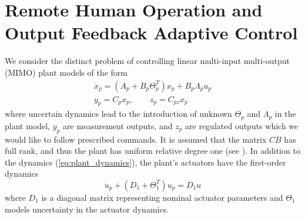 
\section{Remote Human Operation and Output Feedback Adaptive Control}  \label{sec:mimo_problem}
We consider the distinct problem of controlling linear multi-input multi-output (MIMO) plant models of the form
\begin{equation}
\begin{gathered}
\dot x_p = (A_p + B_p \Theta_p^T) x_p + B_p \Lambda_p u_p \\
y_p = C_p x_p, \qquad z_p = C_{pz} x_p \label{eq:plant_dynamics}
\end{gathered}
\end{equation}
where uncertain dynamics lead to the introduction of unknown $\Theta_p$ and $\Lambda_p$ in the plant model, $y_p$ are measurement outputs, and $z_p$ are regulated outputs which we would like to follow prescribed commands. It is assumed that the matrix $CB$ has full rank, and thus the plant has uniform relative degree one (see \cite{qu2016adaptive}). In addition to the dynamics (\ref{eq:plant_dynamics}), the plant's actuators have the first-order dynamics
\begin{equation}
	\dot{u}_p + (D_1 + \Theta_1^T) u_p = D_1 u \label{eq:first_order_act}
\end{equation}
where $D_1$ is a diagonal matrix representing nominal actuator parameters and $\Theta_1$ models uncertainty in the actuator dynamics. 

